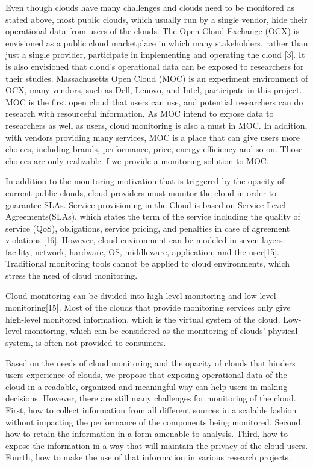 Even though clouds have many challenges and clouds need to be monitored as stated above, most public clouds, which usually run by a single vendor, hide their operational data from users of the clouds. The Open Cloud Exchange (OCX) is envisioned as a public cloud marketplace in which many stakeholders, rather than just a single provider, participate in implementing and operating the cloud [3]. It is also envisioned that cloud’s operational data can be exposed to researchers for their studies. Massachusetts Open Cloud (MOC) is an experiment environment of OCX, many vendors, such as Dell, Lenovo, and Intel, participate in this project. MOC is the first open cloud that users can use, and potential researchers can do research with resourceful information. As MOC intend to expose data to researchers as well as users, cloud monitoring is also a must in MOC. In addition, with vendors providing many services, MOC is a place that can give users more choices, including brands, performance, price, energy efficiency and so on. Those choices are only realizable if we provide a monitoring solution to MOC. 

In addition to the monitoring motivation that is triggered by the opacity of current public clouds, cloud providers must monitor the cloud in order to guarantee SLAs. Service provisioning in the Cloud is based on Service Level Agreements(SLAs), which states the term of the service including the quality of service (QoS), obligations, service pricing, and penalties in case of agreement violations [16]. However, cloud environment can be modeled in seven layers: facility, network, hardware, OS, middleware, application, and the user[15]. Traditional monitoring tools cannot be applied to cloud environments, which stress the need of cloud monitoring.

Cloud monitoring can be divided into high-level monitoring and low-level monitoring[15]. Most of the clouds that provide monitoring services only give high-level monitored information, which is the virtual system of the cloud. Low-level monitoring, which can be considered as the monitoring of clouds’ physical system, is often not provided to consumers. 

Based on the needs of cloud monitoring and the opacity of clouds that hinders users experience of clouds, we propose that exposing operational data of the cloud in a readable, organized and meaningful way can help users in making decisions. However, there are still many challenges for monitoring of the cloud. First, how to collect information from all different sources in a scalable fashion without impacting the performance of the components being monitored. Second, how to retain the information in a form amenable to analysis. Third, how to expose the information in a way that will maintain the privacy of the cloud users. Fourth, how to make the use of that information in various research projects.


